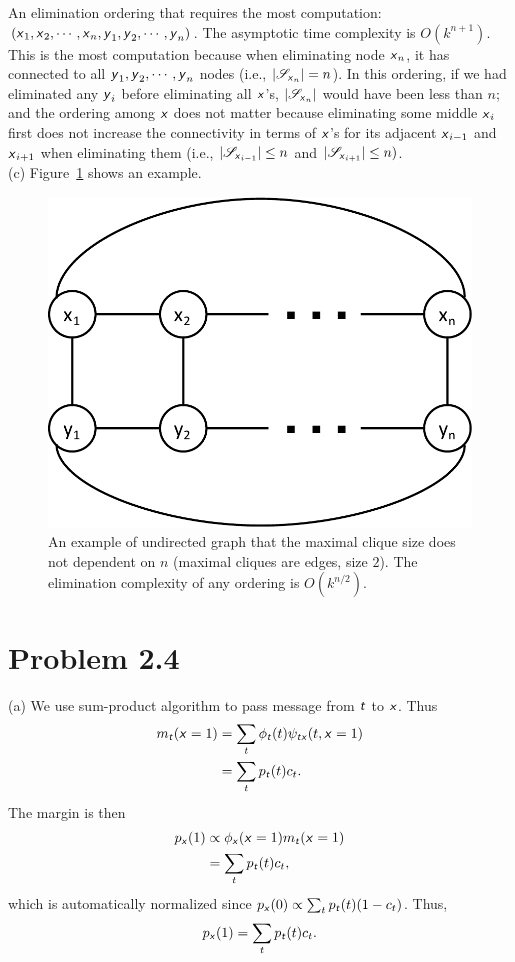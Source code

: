 \documentclass{article}
\newcommand{\s}[1]{\textsf{\textit{#1}}}
\begin{document}
An elimination ordering that requires the most computation:
$(\s{x}_1, \s{x}_2, \cdots, \s{x}_n, \s{y}_1, \s{y}_2, \cdots, \s{y}_n)$.
%
The asymptotic time complexity is $O(k^{n+1})$. This is the most computation because when eliminating node $\s{x}_n$,
it has connected to all $\s{y}_1, \s{y}_2, \cdots, \s{y}_n$ nodes (i.e., $|\mathscr{S}_{\s{x}_n}| = n$). In this ordering,
if we had eliminated any $\s{y}_i$ before eliminating all $\s{x}$'s, $|\mathscr{S}_{\s{x}_n}|$ would have been less than
$n$; and the ordering among $\s{x}$ does not matter because eliminating some middle $\s{x}_i$ first does not increase the
connectivity in terms of $\s{x}$'s for its adjacent $\s{x}_{i-1}$ and $\s{x}_{i+1}$ when eliminating them (i.e., $|\mathscr{S}_{\s{x}_{i-1}}| \leq n$ and $|\mathscr{S}_{\s{x}_{i+1}}| \leq n)$.
%
\\

%
\noindent
(c) Figure~\ref{f:3c} shows an example.
%
\begin{figure}[h]
  \centering
  \includegraphics[width=0.4\columnwidth]{3c.pdf}
  \vspace{-0.1cm}
  \caption{An example of undirected graph that the maximal clique size does not dependent on $n$ (maximal cliques
  are edges, size $2$). The elimination complexity of any ordering is $O(k^{n/2})$.}
  \label{f:3c}
\end{figure}
%
\pagebreak

\section*{Problem 2.4}
%
(a)
%
We use sum-product algorithm to pass message from $\s{t}$ to $\s{x}$. Thus
\begin{align*}
m_{\s{t}}(\s{x}=1) &= \sum_t \phi_{\s{t}}(t)\psi_{\s{t}\s{x}}(t, \s{x}=1) \\
&= \sum_t p_{\s{t}}(t)c_{t}.
\end{align*}
%
The margin is then
\begin{align*}
p_{\s{x}}(1) &\propto \phi_{\s{x}}(\s{x}=1) m_{\s{t}}(\s{x}=1)\\
&= \sum_t p_{\s{t}}(t)c_{t},\\
\end{align*}
%
which is automatically normalized since $p_{\s{x}}(0) \propto \sum_t p_{\s{t}}(t)(1-c_{t})$. 
%
Thus,
\begin{equation*}
p_{\s{x}}(1) = \sum_t p_{\s{t}}(t)c_{t}.
\end{equation*}
\\
\end{document}
